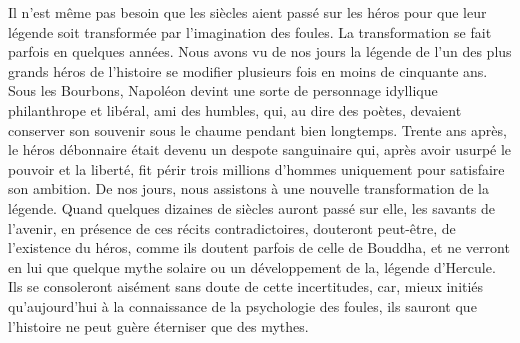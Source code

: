 \documentclass[french,twoside]{book} %
\begin{document}
Il n’est même pas besoin que les siècles aient passé sur les héros pour que leur légende soit transformée par l’imagination des foules. La transformation se fait parfois en quelques années. Nous avons vu de nos jours la légende de l’un des plus grands héros de l’histoire se modifier plusieurs fois en moins de cinquante ans. Sous les Bourbons, Napoléon devint une sorte de personnage idyllique philanthrope et libéral, ami des humbles, qui, au dire des poètes, devaient conserver son souvenir sous le chaume pendant bien longtemps. Trente ans après, le héros débonnaire était devenu un despote sanguinaire qui, après avoir usurpé le pouvoir et la liberté, fit périr trois millions d’hommes uniquement pour satisfaire son ambition. De nos jours, nous assistons à une nouvelle transformation de la légende. Quand quelques dizaines de siècles auront passé sur elle, les savants de l’avenir, en présence de ces récits contra­dictoires, douteront peut-être, de l’existence du héros, comme ils doutent parfois de celle de Bouddha, et ne verront en lui que quelque mythe solaire ou un développe­ment de la, légende d’Hercule. Ils se consoleront aisément sans doute de cette incertitudes, car, mieux initiés qu’aujourd’hui à la connaissance de la psychologie des foules, ils sauront que l’histoire ne peut guère éterniser que des mythes.
\end{document}

